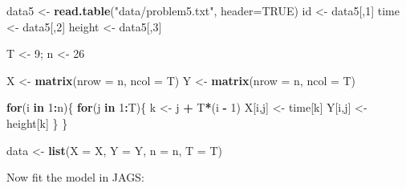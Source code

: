 \documentclass[
]{homework}
\newenvironment{Shaded}{\begin{snugshade}}{\end{snugshade}}
\newcommand{\AttributeTok}[1]{\textcolor[rgb]{0.13,0.29,0.53}{#1}}
\newcommand{\ConstantTok}[1]{\textcolor[rgb]{0.56,0.35,0.01}{#1}}
\newcommand{\ControlFlowTok}[1]{\textcolor[rgb]{0.13,0.29,0.53}{\textbf{#1}}}
\newcommand{\DecValTok}[1]{\textcolor[rgb]{0.00,0.00,0.81}{#1}}
\newcommand{\FunctionTok}[1]{\textcolor[rgb]{0.13,0.29,0.53}{\textbf{#1}}}
\newcommand{\NormalTok}[1]{#1}
\newcommand{\OtherTok}[1]{\textcolor[rgb]{0.56,0.35,0.01}{#1}}
\newcommand{\SpecialCharTok}[1]{\textcolor[rgb]{0.81,0.36,0.00}{\textbf{#1}}}
\newcommand{\StringTok}[1]{\textcolor[rgb]{0.31,0.60,0.02}{#1}}
\begin{document}
\begin{Shaded}
\begin{Highlighting}[]
\NormalTok{data5  }\OtherTok{\textless{}{-}} \FunctionTok{read.table}\NormalTok{(}\StringTok{"data/problem5.txt"}\NormalTok{, }\AttributeTok{header=}\ConstantTok{TRUE}\NormalTok{)}
\NormalTok{id     }\OtherTok{\textless{}{-}}\NormalTok{ data5[,}\DecValTok{1}\NormalTok{] }
\NormalTok{time   }\OtherTok{\textless{}{-}}\NormalTok{ data5[,}\DecValTok{2}\NormalTok{]}
\NormalTok{height }\OtherTok{\textless{}{-}}\NormalTok{ data5[,}\DecValTok{3}\NormalTok{]}

\NormalTok{T }\OtherTok{\textless{}{-}} \DecValTok{9}\NormalTok{; n }\OtherTok{\textless{}{-}} \DecValTok{26}

\NormalTok{X }\OtherTok{\textless{}{-}} \FunctionTok{matrix}\NormalTok{(}\AttributeTok{nrow =}\NormalTok{ n, }\AttributeTok{ncol =}\NormalTok{ T)}
\NormalTok{Y }\OtherTok{\textless{}{-}} \FunctionTok{matrix}\NormalTok{(}\AttributeTok{nrow =}\NormalTok{ n, }\AttributeTok{ncol =}\NormalTok{ T)}

\ControlFlowTok{for}\NormalTok{(i }\ControlFlowTok{in} \DecValTok{1}\SpecialCharTok{:}\NormalTok{n)\{}
  \ControlFlowTok{for}\NormalTok{(j }\ControlFlowTok{in} \DecValTok{1}\SpecialCharTok{:}\NormalTok{T)\{}
\NormalTok{    k }\OtherTok{\textless{}{-}}\NormalTok{ j }\SpecialCharTok{+}\NormalTok{ T}\SpecialCharTok{*}\NormalTok{(i }\SpecialCharTok{{-}} \DecValTok{1}\NormalTok{)}
\NormalTok{    X[i,j] }\OtherTok{\textless{}{-}}\NormalTok{ time[k]  }
\NormalTok{    Y[i,j] }\OtherTok{\textless{}{-}}\NormalTok{ height[k]}
\NormalTok{  \} \}}

\NormalTok{data }\OtherTok{\textless{}{-}} \FunctionTok{list}\NormalTok{(}\AttributeTok{X =}\NormalTok{ X, }\AttributeTok{Y =}\NormalTok{ Y, }\AttributeTok{n =}\NormalTok{ n, }\AttributeTok{T =}\NormalTok{ T)}
\end{Highlighting}
\end{Shaded}

Now fit the model in \textsf{JAGS}:
\end{document}
